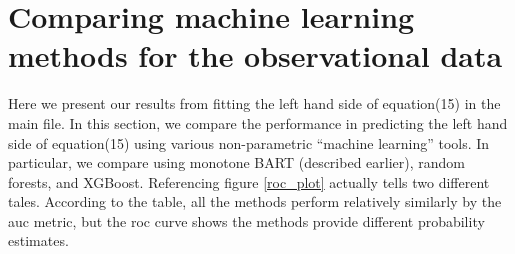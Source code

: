\documentclass[aoas,preprint, 11pt, dvipsnames, table, x11name]{imsart}
\theoremstyle{remark}
\begin{document}
\section{Comparing machine learning methods for the observational data}\label{machine_append}
Here we present our results from fitting the left hand side of equation(15) in the main file.
In this section, we compare the performance in predicting the left hand side of equation(15) using various non-parametric ``machine learning'' tools.  In particular, we compare using monotone BART (described earlier), random forests, and XGBoost. Referencing figure \ref{roc_plot} actually tells two different tales.  According to the table, all the methods perform relatively similarly by the auc metric, but the roc curve shows the methods provide different probability estimates. 


\end{document}
